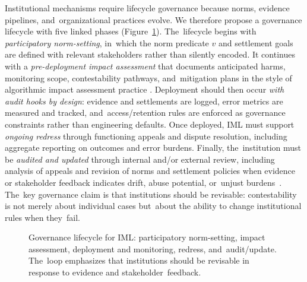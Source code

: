 \documentclass[mca,article,accept,pdftex,oneauthor]{Definitions/mdpi}
\begin{document}
Institutional mechanisms require lifecycle governance because norms, evidence pipelines, and~organizational practices evolve. We therefore propose a governance lifecycle with five linked phases (Figure~\ref{fig:lifecycle}). The~lifecycle begins with \emph{participatory norm-setting}, in~which the norm predicate $v$ and settlement goals are defined with relevant stakeholders rather than silently encoded. It continues with a \emph{pre-deployment impact assessment} that documents anticipated harms, monitoring scope, contestability pathways, and~mitigation plans in the style of algorithmic impact assessment practice \citep{Metcalf2021AIA,Selbst2021AIA}. Deployment should then occur \emph{with audit hooks by design}: evidence and settlements are logged, error metrics are measured and tracked, and~access/retention rules are enforced as governance constraints rather than engineering defaults. Once deployed, IML must support \emph{ongoing redress} through functioning appeals and dispute resolution, including aggregate reporting on outcomes and error burdens. Finally, the~institution must be \emph{audited and updated} through internal and/or external review, including analysis of appeals and revision of norms and settlement policies when evidence or stakeholder feedback indicates drift, abuse potential, or~unjust \mbox{burdens \citep{Raji2020Auditing,Sandvig2014AuditingAlgorithms}.} The~key governance claim is that institutions should be revisable: contestability is not merely about individual cases but~about the ability to change institutional rules when they~fail.

\begin{figure}[H]%
{}
\caption{Governance lifecycle for IML: participatory norm-setting, impact assessment, deployment and monitoring, redress, and~audit/update. The~loop emphasizes that institutions should be revisable in response to evidence and stakeholder~feedback.}
\label{fig:lifecycle}
\end{figure}
\unskip
\end{document}
